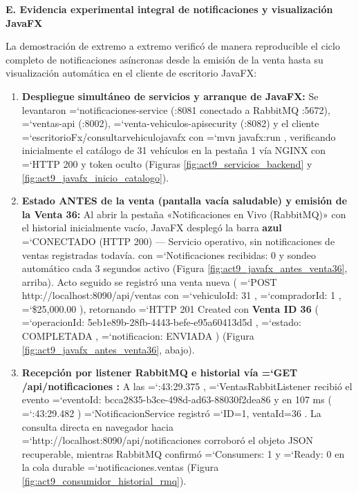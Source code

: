 \documentclass[11pt,a4paper]{article}
\renewcommand{\_}{\oldunderscore\allowbreak}
\DeclareRobustCommand{\texttt}[1]{%
  {\upshape\ttfamily\fontsize{9}{10.8}\selectfont\hyphenchar\font=`\-\relax #1}%
}
\begin{document}
\vspace{0.2cm}
\noindent\textbf{E. Evidencia experimental integral de notificaciones y visualización JavaFX}

\noindent La demostración de extremo a extremo verificó de manera reproducible el ciclo completo de notificaciones asíncronas desde la emisión de la venta hasta su visualización automática en el cliente de escritorio JavaFX:
\begin{enumerate}[leftmargin=*,itemsep=3pt,topsep=2pt]
  \item \textbf{Despliegue simultáneo de servicios y arranque de JavaFX:} Se levantaron \texttt{notificaciones-service} (:8081 conectado a RabbitMQ :5672), \texttt{ventas-api} (:8002), \texttt{venta-vehiculos-api\_security} (:8082) y el cliente \texttt{escritorioFx/\allowbreak{}consultarvehiculojavafx} con \texttt{mvn javafx:\allowbreak{}run}, verificando inicialmente el catálogo de 31 vehículos en la pestaña 1 vía NGINX con \texttt{HTTP 200} y token oculto (Figuras \ref{fig:act9_servicios_backend} y \ref{fig:act9_javafx_inicio_catalogo}).
  \item \textbf{Estado ANTES de la venta (pantalla vacía saludable) y emisión de la Venta 36:} Al abrir la pestaña «Notificaciones en Vivo (RabbitMQ)» con el historial inicialmente vacío, JavaFX desplegó la barra \textbf{azul} \texttt{CONECTADO (HTTP 200) — Servicio operativo, sin notificaciones de ventas registradas todavía.} con \texttt{Notificaciones recibidas: 0} y sondeo automático cada 3 segundos activo (Figura \ref{fig:act9_javafx_antes_venta36}, arriba). Acto seguido se registró una venta nueva (\texttt{POST http:\allowbreak{}/\allowbreak{}/\allowbreak{}localhost:\allowbreak{}8090/\allowbreak{}api/\allowbreak{}ventas} con \texttt{vehiculoId: 31}, \texttt{compradorId: 1}, \texttt{\$25,000.00}), retornando \texttt{HTTP 201 Created} con \textbf{Venta ID 36} (\texttt{operacionId: 5eb1e89b-28fb-4443-befe-e95a60413d5d}, \texttt{estado: COMPLETADA}, \texttt{notificacion: ENVIADA}) (Figura \ref{fig:act9_javafx_antes_venta36}, abajo).
  \item \textbf{Recepción por listener RabbitMQ e historial vía \texttt{GET /\allowbreak{}api/\allowbreak{}notificaciones}:} A las \texttt{11:\allowbreak{}43:\allowbreak{}29.\allowbreak{}375}, \texttt{VentasRabbitListener} recibió el evento \texttt{eventoId: bcca2835-b3ce-498d-ad63-88030f2dea86} y en 107 ms (\texttt{11:\allowbreak{}43:\allowbreak{}29.\allowbreak{}482}) \texttt{NotificacionService} registró \texttt{ID=\allowbreak{}1, ventaId=\allowbreak{}36}. La consulta directa en navegador hacia \texttt{http:\allowbreak{}/\allowbreak{}/\allowbreak{}localhost:\allowbreak{}8090/\allowbreak{}api/\allowbreak{}notificaciones} corroboró el objeto JSON recuperable, mientras RabbitMQ confirmó \texttt{Consumers: 1} y \texttt{Ready: 0} en la cola durable \texttt{notificaciones.\allowbreak{}ventas} (Figura \ref{fig:act9_consumidor_historial_rmq}).

\end{enumerate}
\end{document}
